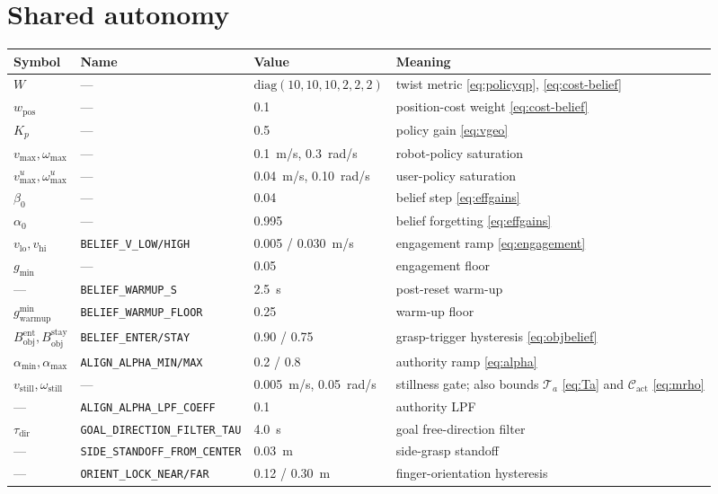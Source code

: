 \documentclass[12pt,a4paper,twoside,openright]{report}
\begin{document}
\section{Shared autonomy}
\begin{tabularx}{\linewidth}{@{}lllX@{}}
\toprule
Symbol & Name & Value & Meaning \\
\midrule
$W$ & --- & $\mathrm{diag}(10,10,10,2,2,2)$ & twist metric \eqref{eq:policyqp}, \eqref{eq:cost-belief} \\
$w_{\text{pos}}$ & --- & 0.1 & position-cost weight \eqref{eq:cost-belief} \\
$K_p$ & --- & 0.5 & policy gain \eqref{eq:vgeo} \\
$v_{\max},\omega_{\max}$ & --- & 0.1~m/s, 0.3~rad/s & robot-policy saturation \\
$v_{\max}^{u},\omega_{\max}^{u}$ & --- & 0.04~m/s, 0.10~rad/s & user-policy saturation \\
$\beta_0$ & --- & 0.04 & belief step \eqref{eq:effgains} \\
$\alpha_0$ & --- & 0.995 & belief forgetting \eqref{eq:effgains} \\
$v_{\text{lo}}, v_{\text{hi}}$ & \texttt{BELIEF\_V\_LOW/HIGH} & 0.005 / 0.030~m/s & engagement ramp \eqref{eq:engagement} \\
$g_{\min}$ & --- & 0.05 & engagement floor \\
--- & \texttt{BELIEF\_WARMUP\_S} & 2.5~s & post-reset warm-up \\
$g_{\text{warmup}}^{\min}$ & \texttt{BELIEF\_WARMUP\_FLOOR} & 0.25 & warm-up floor \\
$B_{\text{obj}}^{\text{ent}}, B_{\text{obj}}^{\text{stay}}$ & \texttt{BELIEF\_ENTER/STAY} & 0.90 / 0.75 & grasp-trigger hysteresis \eqref{eq:objbelief} \\
$\alpha_{\min},\alpha_{\max}$ & \texttt{ALIGN\_ALPHA\_MIN/MAX} & 0.2 / 0.8 & authority ramp \eqref{eq:alpha} \\
$v_{\text{still}},\omega_{\text{still}}$ & --- & 0.005~m/s, 0.05~rad/s & stillness gate; also bounds $\mathcal{T}_a$ \eqref{eq:Ta} and $\mathcal{C}_{\mathrm{act}}$ \eqref{eq:mrho} \\
--- & \texttt{ALIGN\_ALPHA\_LPF\_COEFF} & 0.1 & authority LPF \\
$\tau_{\text{dir}}$ & \texttt{GOAL\_DIRECTION\_FILTER\_TAU} & 4.0~s & goal free-direction filter \\
--- & \texttt{SIDE\_STANDOFF\_FROM\_CENTER} & 0.03~m & side-grasp standoff \\
--- & \texttt{ORIENT\_LOCK\_NEAR/FAR} & 0.12 / 0.30~m & finger-orientation hysteresis \\
\bottomrule
\end{tabularx}
\end{document}
